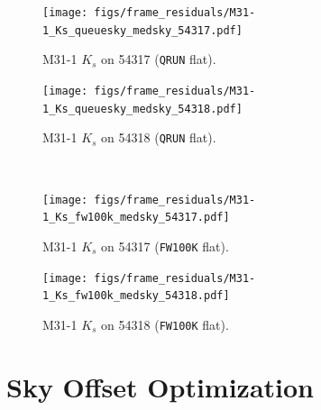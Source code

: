 \documentclass[iop]{emulateapj}
\begin{document}
\begin{figure}[p]
\begin{minipage}[b]{0.46\linewidth}
  \centering
\texttt{[image: figs/frame\_residuals/M31-1\_Ks\_queuesky\_medsky\_54317.pdf]}
\caption{M31-1 $K_s$ on 54317 (\texttt{QRUN} flat).}
\label{fig:m311Ks_frameresiduals_54317_qrun}
\end{minipage}
\begin{minipage}[b]{0.46\linewidth}
  \centering
\texttt{[image: figs/frame\_residuals/M31-1\_Ks\_queuesky\_medsky\_54318.pdf]}
\caption{M31-1 $K_s$ on 54318 (\texttt{QRUN} flat).}
\label{fig:m311Ks_frameresiduals_54318_qrun}
\end{minipage} \\
\begin{minipage}[b]{0.46\linewidth}
\texttt{[image: figs/frame\_residuals/M31-1\_Ks\_fw100k\_medsky\_54317.pdf]}
\caption{M31-1 $K_s$ on 54317 (\texttt{FW100K} flat).}
\label{fig:m311Ks_frameresiduals_54317_fw100k}
\end{minipage}
%
\begin{minipage}[b]{0.46\linewidth}
\texttt{[image: figs/frame\_residuals/M31-1\_Ks\_fw100k\_medsky\_54318.pdf]}
\caption{M31-1 $K_s$ on 54318 (\texttt{FW100K} flat).}
\label{fig:m311Ks_frameresiduals_54318_fw100k}
\end{minipage}

\end{figure}


\section{Sky Offset Optimization}
\label{sec:scalar}
\end{document}
